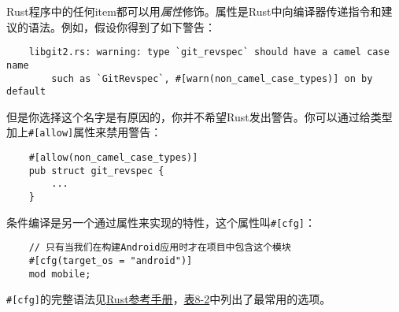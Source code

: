 Rust程序中的任何item都可以用\emph{属性}修饰。属性是Rust中向编译器传递指令和建议的语法。例如，假设你得到了如下警告：
\begin{verbatim}
    libgit2.rs: warning: type `git_revspec` should have a camel case name
        such as `GitRevspec`, #[warn(non_camel_case_types)] on by default
\end{verbatim}

但是你选择这个名字是有原因的，你并不希望Rust发出警告。你可以通过给类型加上\texttt{\#[allow]}属性来禁用警告：
\begin{verbatim}
    #[allow(non_camel_case_types)]
    pub struct git_revspec {
        ...
    }
\end{verbatim}

条件编译是另一个通过属性来实现的特性，这个属性叫\texttt{\#[cfg]}：
\begin{verbatim}
    // 只有当我们在构建Android应用时才在项目中包含这个模块
    #[cfg(target_os = "android")]
    mod mobile;
\end{verbatim}

\texttt{\#[cfg]}的完整语法见\href{https://doc.rust-lang.org/reference/conditional-compilation.html}{Rust参考手册}，\hyperref[t8-2]{表8-2}中列出了最常用的选项。

